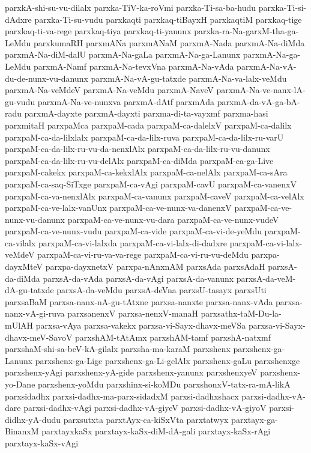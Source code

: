 {parxkA-shi-su-vu-dilalx
parxka-TiV-ka-roVmi
parxka-Ti-sa-ba-hudu
parxka-Ti-si-dAdxre
parxka-Ti-su-vudu
parxkaqti
parxkaq-tiBayxH
parxkaqtiM
parxkaq-tige
parxkaq-ti-va-rege
parxkaq-tiya
parxkaq-ti-yanunx
parxka-ra-Na-garxM-tha-ga-LeMdu
parxkumaRH
parxmANa
parxmANaM
parxmA-Nada
parxmA-Na-diMda
parxmA-Na-diM-dalU
parxmA-Na-gaLa
parxmA-Na-ga-Lanunx
parxmA-Na-ga-LeMdu
parxmA-Namf
parxmA-Na-tevxVna
parxmA-Na-vAda
parxmA-Na-vA-du-de-nunx-vu-danunx
parxmA-Na-vA-gu-tatxde
parxmA-Na-va-lalx-veMdu
parxmA-Na-veMdeV
parxmA-Na-veMdu
parxmA-NaveV
parxmA-Na-ve-nanx-lA-gu-vudu
parxmA-Na-ve-nunxva
parxmA-dAtf
parxmAda
parxmA-da-vA-ga-bA-radu
parxmA-dayxte
parxmA-dayxti
parxma-di-ta-vayxmf
parxma-hasi
parxmitaH
parxpaMca
parxpaM-cada
parxpaM-ca-dalelxV
parxpaM-ca-dalilx
parxpaM-ca-da-lilxlalx
parxpaM-ca-da-lilx-ruva
parxpaM-ca-da-lilx-ru-varU
parxpaM-ca-da-lilx-ru-vu-da-nenxlAlx
parxpaM-ca-da-lilx-ru-vu-danunx
parxpaM-ca-da-lilx-ru-vu-delAlx
parxpaM-ca-diMda
parxpaM-ca-ga-Live
parxpaM-cakekx
parxpaM-ca-kekxlAlx
parxpaM-ca-nelAlx
parxpaM-ca-sAra
parxpaM-ca-saq-SiTxge
parxpaM-ca-vAgi
parxpaM-cavU
parxpaM-ca-vanenxV
parxpaM-ca-va-nenxlAlx
parxpaM-ca-vanunx
parxpaM-caveV
parxpaM-ca-velAlx
parxpaM-ca-ve-lalx-vanUnx
parxpaM-ca-ve-nunx-va-danenxV
parxpaM-ca-ve-nunx-vu-danunx
parxpaM-ca-ve-nunx-vu-dara
parxpaM-ca-ve-nunx-vudeV
parxpaM-ca-ve-nunx-vudu
parxpaM-ca-vide
parxpaM-ca-vi-de-yeMdu
parxpaM-ca-vilalx
parxpaM-ca-vi-lalxda
parxpaM-ca-vi-lalx-di-dadxre
parxpaM-ca-vi-lalx-veMdeV
parxpaM-ca-vi-ru-va-va-rege
parxpaM-ca-vi-ru-vu-deMdu
parxpa-dayxMteV
parxpa-dayxnetxV
parxpa-nAnxnAM
parxsAda
parxsAdaH
parxsA-da-diMda
parxsA-da-vAda
parxsA-da-vAgi
parxsA-da-vanunx
parxsA-da-veM-dA-gu-tatxde
parxsA-da-veMdu
parxsA-deVna
parxsU-tasayx
parxsUti
parxsaBaM
parxsa-nanx-nA-gu-tAtxne
parxsa-nanxte
parxsa-nanx-vAda
parxsa-nanx-vA-gi-ruva
parxsanenxV
parxsa-nenxV-manaH
parxsathx-taM-Du-la-mUlAH
parxsa-vAya
parxsa-vakekx
parxsa-vi-Sayx-dhavx-meVSa
parxsa-vi-Sayx-dhavx-meV-SavoV
parxshAM-tAtAmx
parxshAM-tamf
parxshA-natxmf
parxshaM-shi-sa-beV-kA-gilalx
parxsha-ma-karaM
parxshenx
parxshenx-ga-Lanunx
parxshenx-ga-Lige
parxshenx-ga-Li-gelAlx
parxshenx-gaLu
parxshenxge
parxshenx-yAgi
parxshenx-yA-gide
parxshenx-yanunx
parxshenxyeV
parxshenx-yo-Dane
parxshenx-yoMdu
parxshinx-si-koMDu
parxshonxV-tatx-ra-mA-likA
parxsidadhx
parxsi-dadhx-ma-parx-sidadxM
parxsi-dadhxshacx
parxsi-dadhx-vA-dare
parxsi-dadhx-vAgi
parxsi-dadhx-vA-giyeV
parxsi-dadhx-vA-giyoV
parxsi-didhx-yA-dudu
parxsutxta
parxtAyx-ca-kiSxVta
parxtatwyx
parxtayx-ga-BinanxM
parxtayxkaSx
parxtayx-kaSx-diM-dA-gali
parxtayx-kaSx-rAgi
parxtayx-kaSx-vAgi
}
